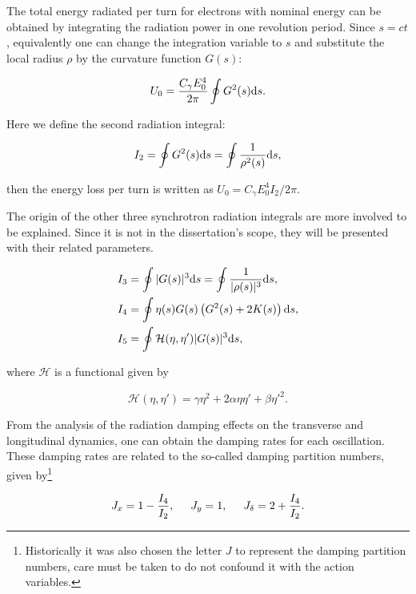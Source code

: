 The total energy radiated per turn for electrons with nominal energy can be obtained by integrating the radiation power in one revolution period. Since $s = ct$, equivalently one can change the integration variable to $s$ and substitute the local radius $\rho$ by the curvature function $G(s)$:

\begin{equation}
U_0 = \dfrac{C_{\gamma}E_0^4}{2\pi} \oint G^{2}(s) \mathrm{d} s.    
\end{equation}

Here we define the second radiation integral:

\begin{equation}
    I_2 = \oint G^{2}(s) \mathrm{d} s = \oint \dfrac{1}{\rho^2(s)} \mathrm{d} s,
\end{equation}

then the energy loss per turn is written as $U_0 = C_{\gamma}E_0^4 I_2/2\pi$.

The origin of the other three synchrotron radiation integrals are more involved to be explained. Since it is not in the dissertation's scope, they will be presented with their related parameters. 

\begin{align}
    I_3 &= \oint |G(s)|^3 \mathrm{d} s = \oint \dfrac{1}{|\rho(s)|^3} \mathrm{d} s, \\
    I_4 &= \oint \eta(s) G(s) \left(G^2(s) + 2 K(s)\right) \mathrm{d} s, \\
    I_5 &= \oint \mathcal{H}(\eta, \eta') |G(s)|^3 \mathrm{d} s,
    \label{eq:integral5}
\end{align}

where $\mathcal{H}$ is a functional given by

\begin{equation}
    \mathcal{H}(\eta, \eta') = \gamma \eta^2 + 2 \alpha \eta \eta' + \beta {\eta'}^2.
\end{equation}

From the analysis of the radiation damping effects on the transverse and longitudinal dynamics, one can obtain the damping rates for each oscillation. These damping rates are related to the so-called damping partition numbers, given by\footnote{Historically it was also chosen the letter $J$ to represent the damping partition numbers, care must be taken to do not confound it with the action variables.}

\begin{equation}
    J_x = 1 - \dfrac{I_4}{I_2}, \hspace{0.5cm} J_y = 1, \hspace{0.5cm} J_{\delta} = 2 + \dfrac{I_4}{I_2}.
\end{equation}

